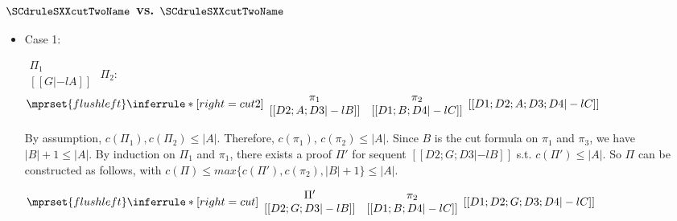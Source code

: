 \subsubsection{$\SCdruleSXXcutTwoName$ vs. $\SCdruleSXXcutTwoName$}
\begin{itemize}
\item Case 1:
      \begin{center}
        \scriptsize
        \begin{math}
          \begin{array}{c}
            \Pi_1 \\
            {[[G |-l A]]}
          \end{array}
        \end{math}
        \qquad\qquad
        $\Pi_2:$
        \begin{math}
          $$\mprset{flushleft}
          \inferrule* [right={\tiny cut2}] {
            {
              \begin{array}{cc}
                \pi_1 & \pi_2 \\
                {[[D2; A; D3 |-l B]]} & {[[D1; B; D4 |-l C]]}
              \end{array}
            }
          }{[[D1; D2; A; D3; D4 |-l C]]}
        \end{math}
      \end{center}
      By assumption, $c(\Pi_1),c(\Pi_2)\leq |A|$. Therefore, $c(\pi_1)$,
      $c(\pi_2)\leq |A|$. Since $B$ is the cut formula on $\pi_1$ and
      $\pi_3$, we have $|B|+1\leq|A|$. By induction on $\Pi_1$ and
      $\pi_1$, there exists a proof $\Pi'$ for sequent
      $[[D2; G; D3 |-l B]]$ s.t. $c(\Pi')\leq|A|$. So $\Pi$ can be
      constructed as follows,  with
      $c(\Pi)\leq max\{c(\Pi'),c(\pi_2),|B|+1\}\leq |A|$.
      \begin{center}
        \scriptsize
        \begin{math}
          $$\mprset{flushleft}
          \inferrule* [right={\tiny cut}] {
            {
              \begin{array}{cc}
                \Pi' & \pi_2 \\
                {[[D2; G; D3 |-l B]]} & {[[D1; B; D4 |-l C]]}
              \end{array}
            }
          }{[[D1; D2; G; D3; D4 |-l C]]}
        \end{math}
      \end{center}


\end{itemize}
